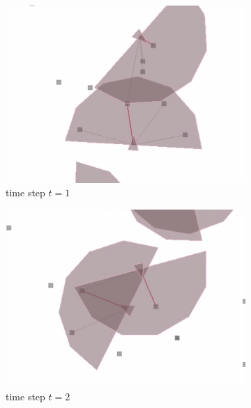 \documentclass[10pt,a4paper,DIV=11]{scrreprt}
\begin{document}
\begin{figure}[H]
\centering
\begin{subfigure}{.3\textwidth}
  \centering
  \includegraphics[width=\linewidth]{files/action/1.png}
  \caption{time step $t=1$}
  \label{fig:a1}
\end{subfigure}%
\begin{subfigure}{.3\textwidth}
  \centering
  \includegraphics[width=\linewidth]{files/action/2.png}
  \caption{time step $t=2$}
  \label{fig:a2}
\end{subfigure}%
\begin{subfigure}{.3\textwidth}
  \centering

\end{subfigure}
\end{figure}
\end{document}
